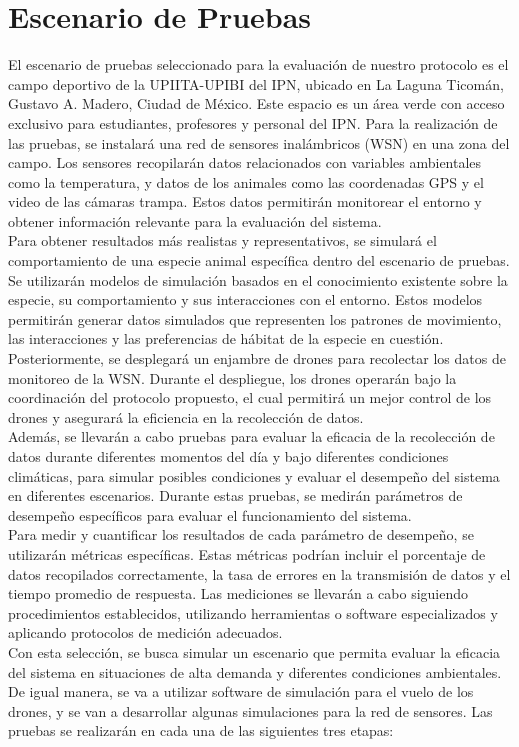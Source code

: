 \chapter{Escenario de Pruebas}

El escenario de pruebas seleccionado para la evaluación de nuestro protocolo es el campo deportivo de la UPIITA-UPIBI del IPN, ubicado en La Laguna Ticomán, Gustavo A. Madero, Ciudad de México. Este espacio es un área verde con acceso exclusivo para estudiantes, profesores y personal del IPN. Para la realización de las pruebas, se instalará una red de sensores inalámbricos (WSN) en una zona del campo. Los sensores recopilarán datos relacionados con variables ambientales como la temperatura, y datos de los animales como las coordenadas GPS y el video de las cámaras trampa. Estos datos permitirán monitorear el entorno y obtener información relevante para la evaluación del sistema.\\
Para obtener resultados más realistas y representativos, se simulará el comportamiento de una especie animal específica dentro del escenario de pruebas. Se utilizarán modelos de simulación basados en el conocimiento existente sobre la especie, su comportamiento y sus interacciones con el entorno. Estos modelos permitirán generar datos simulados que representen los patrones de movimiento, las interacciones y las preferencias de hábitat de la especie en cuestión.\\
Posteriormente, se desplegará un enjambre de drones para recolectar los datos de monitoreo de la WSN. Durante el despliegue, los drones operarán bajo la coordinación del protocolo propuesto, el cual permitirá un mejor control de los drones y asegurará la eficiencia en la recolección de datos.\\
Además, se llevarán a cabo pruebas para evaluar la eficacia de la recolección de datos durante diferentes momentos del día y bajo diferentes condiciones climáticas, para simular posibles condiciones y evaluar el desempeño del sistema en diferentes escenarios. Durante estas pruebas, se medirán parámetros de desempeño específicos para evaluar el funcionamiento del sistema.\\
Para medir y cuantificar los resultados de cada parámetro de desempeño, se utilizarán métricas específicas. Estas métricas podrían incluir el porcentaje de datos recopilados correctamente, la tasa de errores en la transmisión de datos y el tiempo promedio de respuesta. Las mediciones se llevarán a cabo siguiendo procedimientos establecidos, utilizando herramientas o software especializados y aplicando protocolos de medición adecuados.\\
Con esta selección, se busca simular un escenario que permita evaluar la eficacia del sistema en situaciones de alta demanda y diferentes condiciones ambientales. De igual manera, se va a utilizar software de simulación para el vuelo de los drones, y se van a desarrollar algunas simulaciones para la red de sensores. Las pruebas se realizarán en cada una de las siguientes tres etapas:

